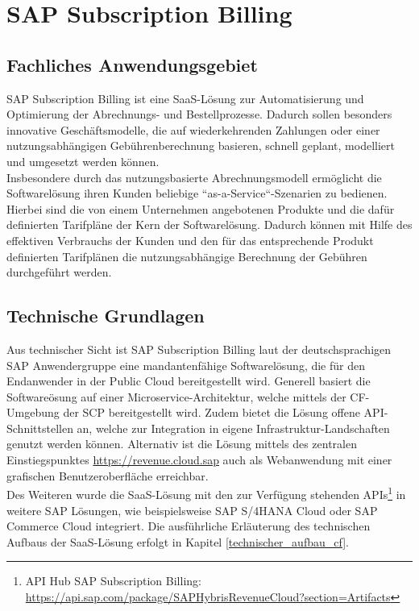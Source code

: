 \section{SAP Subscription Billing}
\subsection{Fachliches Anwendungsgebiet}
SAP Subscription Billing ist eine \ac{SaaS}-Lösung zur Automatisierung und Optimierung der Abrechnungs- und Bestellprozesse. Dadurch sollen besonders innovative Geschäftsmodelle, die auf wiederkehrenden Zahlungen oder einer nutzungsabhängigen Gebührenberechnung basieren, schnell geplant, modelliert und umgesetzt werden können.\\ 
Insbesondere durch das nutzungsbasierte Abrechnungsmodell ermöglicht die Softwarelösung ihren Kunden beliebige ``as-a-Service``-Szenarien zu bedienen.
Hierbei sind die von einem Unternehmen angebotenen Produkte und die dafür definierten Tarifpläne der Kern der Softwarelösung. Dadurch können mit Hilfe des effektiven Verbrauchs der Kunden und den für das entsprechende Produkt definierten Tarifplänen die nutzungsabhängige Berechnung der Gebühren durchgeführt werden.\autocite[Vgl.][SAP Subscription Billing]{SAPSEodereinSAPKonzernunternehmen.2019}
\\
\newpage
\subsection{Technische Grundlagen}
Aus technischer Sicht ist SAP Subscription Billing laut der deutschsprachigen SAP Anwendergruppe eine mandantenfähige Softwarelösung, die für den Endanwender in der Public Cloud bereitgestellt wird. Generell basiert die Softwareösung auf einer Microservice-Architektur, welche mittels der \ac{CF}-Umgebung der \ac{SCP} bereitgestellt wird. Zudem bietet die Lösung offene \ac{API}-Schnittstellen an, welche zur Integration in eigene Infrastruktur-Landschaften genutzt werden können. Alternativ ist die Lösung mittels des zentralen Einstiegspunktes \url{https://revenue.cloud.sap} auch als Webanwendung mit einer grafischen Benutzeroberfläche erreichbar. \autocite[Vgl.][]{DeutschsprachigeSAPAnwendergruppe.2018}\\
Des Weiteren wurde die \ac{SaaS}-Lösung mit den zur Verfügung stehenden \acsp{API}\footnote{\ac{API} Hub SAP Subscription Billing: \url{https://api.sap.com/package/SAPHybrisRevenueCloud?section=Artifacts}} in weitere SAP Lösungen, wie beispielsweise SAP S/4HANA Cloud oder SAP Commerce Cloud integriert.\autocite[Vgl.][SAP Subscription Billing - Integration]{SAPSEodereinSAPKonzernunternehmen.20200205} Die ausführliche Erläuterung des technischen Aufbaus der \ac{SaaS}-Lösung erfolgt in Kapitel \ref{technischer_aufbau_cf}.\\


